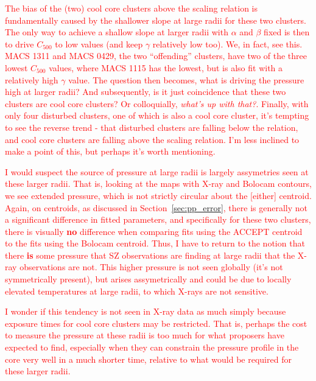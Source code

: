 \documentclass[iop,numberedappendix,apj]{emulateapj}
\begin{document}
\textcolor{red}{The bias of the (two) cool core clusters above the scaling relation is fundamentally caused by the shallower
slope at large radii for these two clusters. The only way to achieve a shallow slope at larger radii with $\alpha$ and $\beta$ 
fixed is then to drive $C_{500}$ to low values (and keep $\gamma$ relatively low too). We, in fact, see this. MACS 1311 and MACS
0429, the two ``offending'' clusters, have two of the three lowest $C_{500}$ values, where MACS 1115 has the lowest, but is also
fit with a relatively high $\gamma$ value. The question then becomes, what is driving the pressure high at larger radii? And
subsequently, is it just coincidence that these two clusters are cool core clusters? Or colloquially, \emph{what's up with that?}.
Finally, with only four disturbed clusters, one of which is also a cool core cluster, it's tempting to see the reverse trend -
that disturbed clusters are falling below the relation, and cool core clusters are falling above the scaling relation. I'm less
inclined to make a point of this, but perhaps it's worth mentioning.}

\textcolor{red}{I would suspect the source of pressure at large radii is largely assymetries seen at these larger radii. That is,
looking at the maps with X-ray and Bolocam contours, we see extended pressure, which is not strictly circular about the [either]
centroid. Again, on centroids, as discussed in Section~\ref{sec:pp_error}, there is generally not a significant difference in 
fitted parameters, and specifically for these two clusters, there is visually \textbf{no} difference when comparing fits using 
the ACCEPT centroid to the fits using the Bolocam centroid. Thus, I have to return to the notion that there \textbf{is} some
pressure that SZ observations are finding at large radii that the X-ray observations are not. This higher pressure is not seen
globally (it's not symmetrically present), but arises assymetrically and could be due to locally elevated temperatures at large
radii, to which X-rays are not sensitive.}

\textcolor{red}{I wonder if this tendency is not seen in X-ray data as much simply because exposure times for cool core clusters
may be restricted. That is, perhaps the cost to measure the pressure at these radii is too much for what proposers have expected
to find, especially when they can constrain the pressure profile in the core very well in a much shorter time, relative to what
would be required for these larger radii.}


\end{document}
